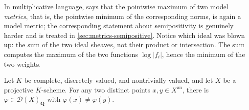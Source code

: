 In multiplicative language,  says that the
pointwise maximum of two model \emph{metrics}, that is, the pointwise
minimum of the corresponding norms, is again a model metric; the
corresponding statement about semipositivity is genuinely harder and is
treated in \cref{sec:metrics-semipositive}. Notice which ideal was blown up:
the sum of the two ideal sheaves, not their product or intersection. The
sum computes the maximum of the two functions $\log|f_i|$, hence the
minimum of the two weights.

\begin{lemma}
\label{lem:metrics-model-separation}
Let $K$ be complete, discretely valued, and nontrivially valued, and let
$X$ be a projective $K$-scheme. For any two distinct points
$x,y\in X^{\mathrm{an}}$, there is $\varphi\in\mathcal D(X)_{\mathbf Q}$
with $\varphi(x)\ne\varphi(y)$.
\end{lemma}

